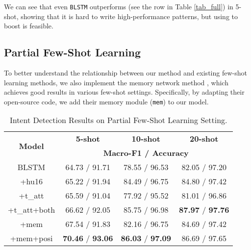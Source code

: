 
We can see that even \texttt{BLSTM} outperforms \RE (see the \RE row in Table \ref{tab_full}) in 5-shot, showing that it is hard to write high-performance \RE patterns, but using \RE to boost \NN is feasible. 


\subsection{Partial Few-Shot Learning}
To better understand the relationship between our method and existing few-shot learning methods, we also implement the memory network method \cite{kaiser2017learning}, which achieves good results in various few-shot settings. Specifically, by adapting their open-source code, we add their memory module (\texttt{mem}) to our \BLSTM model.

\begin{table}
\setlength{\tabcolsep}{0.23em}
\centering
\small{
\begin{tabular}{|c|c|c|c|}

\hline
\multirow{2}{*}{\textbf{Model}}  & \multicolumn{1}{|c|}{\textbf{5-shot}} & \multicolumn{1}{|c|}{\textbf{10-shot}} & \multicolumn{1}{|c|}{\textbf{20-shot}}  \\
\cline{2-4}
 & \multicolumn{3}{|c|}{\textbf{Macro-F1 / Accuracy}}   \\
\hline
BLSTM & 64.73 / 91.71 & 78.55 / 96.53 & 82.05 / 97.20 \\
\hline
+hu16 & 65.22 / 91.94 & 84.49 / 96.75 & 84.80 / 97.42 \\
\hline
+t\_att & 65.59 / 91.04 & 77.92 / 95.52 & 81.01 / 96.86 \\
\hline
+t\_att+both & 66.62 / 92.05 & 85.75 / 96.98 & \textbf{87.97} / \textbf{97.76} \\
\hline
+mem & 67.54 / 91.83 & 82.16 / 96.75 & 84.69 / 97.42 \\
\hline
+mem+posi & \textbf{70.46} / \textbf{93.06} & \textbf{86.03} / \textbf{97.09} & 86.69 / 97.65 \\
\hline

\end{tabular}
}
\caption{Intent Detection Results on Partial Few-Shot Learning Setting.}
\label{tab_intent_few_fill}
\end{table}

